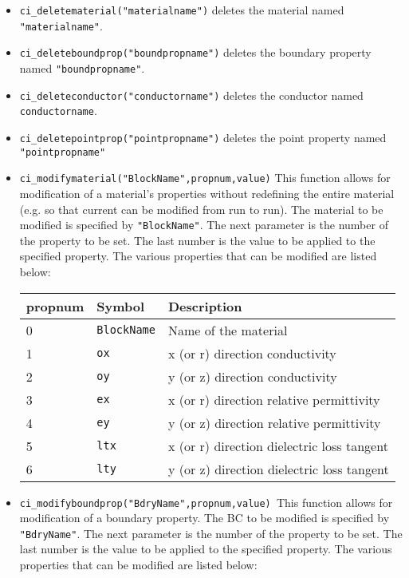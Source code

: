 \begin{itemize}
\item \texttt{ci\_deletematerial("materialname")} deletes the material named
\texttt{"materialname"}.

\item \texttt{ci\_deleteboundprop("boundpropname")} deletes the boundary property
named \texttt{"boundpropname"}.

\item \texttt{ci\_deleteconductor("conductorname")} deletes the conductor named
\texttt{conductorname}.

\item \texttt{ci\_deletepointprop("pointpropname")} deletes the point property named
\texttt{"pointpropname"}

\item \texttt{ci\_modifymaterial("BlockName",propnum,value)} This function allows for
modification of a material's properties without redefining the
entire material (e.g. so that current can be modified from run to
run). The material to be modified is specified by
\texttt{"BlockName"}. The next parameter is the number of the
property to be set. The last number is the value to be applied to
the specified property. The various properties that can be modified
are listed below:

\begin{tabular}{lll}
propnum & Symbol &  Description \\ \hline
 0 & \texttt{BlockName} & Name of the material \\
 1 & \texttt{ox} & x (or r) direction conductivity \\
 2 & \texttt{oy} & y (or z) direction conductivity \\
 3 & \texttt{ex} & x (or r) direction relative permittivity \\
 4 & \texttt{ey} & y (or z) direction relative permittivity \\
 5 & \texttt{ltx} & x (or r) direction dielectric loss tangent \\
 6 & \texttt{lty} & y (or z) direction dielectric loss tangent \\
\end{tabular}


\item \texttt{ci\_modifyboundprop("BdryName",propnum,value) }This function allows for
modification of a boundary property. The BC to be modified is specified by
\texttt{"BdryName"}. The next parameter is the number of the property to be
set. The last number is the value to be applied to the specified property.
The various properties that can be modified are listed below:


\end{itemize}
